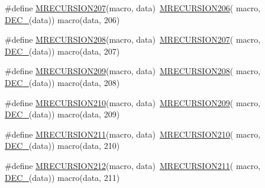 \begin{DoxyCompactItemize}
\item 
\#define \mbox{\hyperlink{group__group__sam0__utils__mrecursion_ga2c5250a666b28836b1b47a5719e89001}{M\+R\+E\+C\+U\+R\+S\+I\+O\+N207}}(macro,  data)~\mbox{\hyperlink{group__group__sam0__utils__mrecursion_gaabaf99cc947f3217c4a84585f4674b79}{M\+R\+E\+C\+U\+R\+S\+I\+O\+N206}}(  macro, \mbox{\hyperlink{group__group__sam0__utils__mrecursion_ga1d23d683797679dca8c3512a54a5dcae}{D\+E\+C\+\_\+}}(data))   macro(data, 206)
\item 
\#define \mbox{\hyperlink{group__group__sam0__utils__mrecursion_ga064aaf5aca80528731a580908f6a5142}{M\+R\+E\+C\+U\+R\+S\+I\+O\+N208}}(macro,  data)~\mbox{\hyperlink{group__group__sam0__utils__mrecursion_ga2c5250a666b28836b1b47a5719e89001}{M\+R\+E\+C\+U\+R\+S\+I\+O\+N207}}(  macro, \mbox{\hyperlink{group__group__sam0__utils__mrecursion_ga1d23d683797679dca8c3512a54a5dcae}{D\+E\+C\+\_\+}}(data))   macro(data, 207)
\item 
\#define \mbox{\hyperlink{group__group__sam0__utils__mrecursion_ga414e00269be46274269d32c3441760ff}{M\+R\+E\+C\+U\+R\+S\+I\+O\+N209}}(macro,  data)~\mbox{\hyperlink{group__group__sam0__utils__mrecursion_ga064aaf5aca80528731a580908f6a5142}{M\+R\+E\+C\+U\+R\+S\+I\+O\+N208}}(  macro, \mbox{\hyperlink{group__group__sam0__utils__mrecursion_ga1d23d683797679dca8c3512a54a5dcae}{D\+E\+C\+\_\+}}(data))   macro(data, 208)
\item 
\#define \mbox{\hyperlink{group__group__sam0__utils__mrecursion_ga70903b9009c4d93b5e6bd6dcd052023f}{M\+R\+E\+C\+U\+R\+S\+I\+O\+N210}}(macro,  data)~\mbox{\hyperlink{group__group__sam0__utils__mrecursion_ga414e00269be46274269d32c3441760ff}{M\+R\+E\+C\+U\+R\+S\+I\+O\+N209}}(  macro, \mbox{\hyperlink{group__group__sam0__utils__mrecursion_ga1d23d683797679dca8c3512a54a5dcae}{D\+E\+C\+\_\+}}(data))   macro(data, 209)
\item 
\#define \mbox{\hyperlink{group__group__sam0__utils__mrecursion_ga3448b343677307b3d5c5ec396ae73c4e}{M\+R\+E\+C\+U\+R\+S\+I\+O\+N211}}(macro,  data)~\mbox{\hyperlink{group__group__sam0__utils__mrecursion_ga70903b9009c4d93b5e6bd6dcd052023f}{M\+R\+E\+C\+U\+R\+S\+I\+O\+N210}}(  macro, \mbox{\hyperlink{group__group__sam0__utils__mrecursion_ga1d23d683797679dca8c3512a54a5dcae}{D\+E\+C\+\_\+}}(data))   macro(data, 210)
\item 
\#define \mbox{\hyperlink{group__group__sam0__utils__mrecursion_gad848cc0ac4bd174398a6421a1da308c7}{M\+R\+E\+C\+U\+R\+S\+I\+O\+N212}}(macro,  data)~\mbox{\hyperlink{group__group__sam0__utils__mrecursion_ga3448b343677307b3d5c5ec396ae73c4e}{M\+R\+E\+C\+U\+R\+S\+I\+O\+N211}}(  macro, \mbox{\hyperlink{group__group__sam0__utils__mrecursion_ga1d23d683797679dca8c3512a54a5dcae}{D\+E\+C\+\_\+}}(data))   macro(data, 211)

\end{DoxyCompactItemize}

